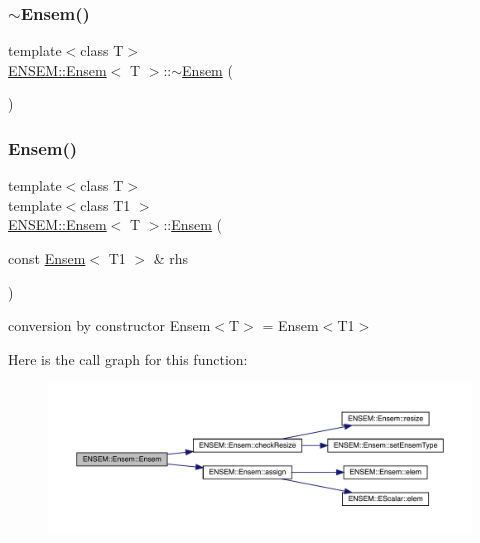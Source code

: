 \subsubsection{\texorpdfstring{$\sim$Ensem()}{~Ensem()}\hspace{0.1cm}{\footnotesize\ttfamily [1/3]}}
{\footnotesize\ttfamily template$<$class T$>$ \\
\mbox{\hyperlink{classENSEM_1_1Ensem}{E\+N\+S\+E\+M\+::\+Ensem}}$<$ T $>$\+::$\sim$\mbox{\hyperlink{classENSEM_1_1Ensem}{Ensem}} (\begin{DoxyParamCaption}{ }\end{DoxyParamCaption})\hspace{0.3cm}{\ttfamily [inline]}}

\mbox{\label{classENSEM_1_1Ensem_ab0e04ebf09af997fb7f1477cdc48145b}} 
\subsubsection{\texorpdfstring{Ensem()}{Ensem()}\hspace{0.1cm}{\footnotesize\ttfamily [2/9]}}
{\footnotesize\ttfamily template$<$class T$>$ \\
template$<$class T1 $>$ \\
\mbox{\hyperlink{classENSEM_1_1Ensem}{E\+N\+S\+E\+M\+::\+Ensem}}$<$ T $>$\+::\mbox{\hyperlink{classENSEM_1_1Ensem}{Ensem}} (\begin{DoxyParamCaption}\item[{const \mbox{\hyperlink{classENSEM_1_1Ensem}{Ensem}}$<$ T1 $>$ \&}]{rhs }\end{DoxyParamCaption})\hspace{0.3cm}{\ttfamily [inline]}}



conversion by constructor Ensem$<$\+T$>$ = Ensem$<$\+T1$>$ 

Here is the call graph for this function\+:
\nopagebreak
\begin{figure}[H]
\begin{center}
\leavevmode
\includegraphics[width=350pt]{d7/d3e/classENSEM_1_1Ensem_ab0e04ebf09af997fb7f1477cdc48145b_cgraph}
\end{center}
\end{figure}
\mbox{\label{classENSEM_1_1Ensem_a5e80cf6ad71f96ba2fa28cac27f06003}} 
